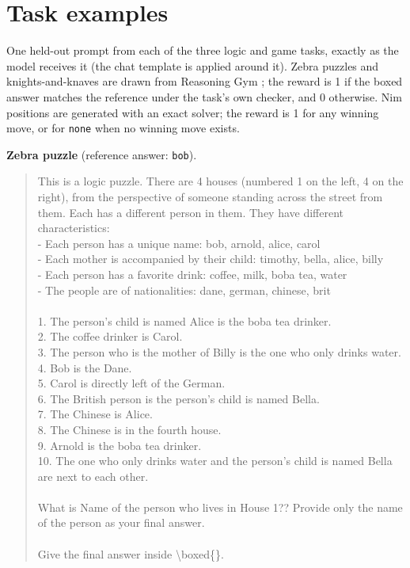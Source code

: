 \documentclass[
  10pt,
]{article}
\begin{document}
\section{Task examples}\label{task-examples}

One held-out prompt from each of the three logic and game tasks, exactly as the model receives it
(the chat template is applied around it). Zebra puzzles and knights-and-knaves are drawn from
Reasoning Gym \cite{r17}; the reward is 1 if the boxed answer matches the reference under the task's
own checker, and 0 otherwise. Nim positions are generated with an exact solver; the reward is 1 for
any winning move, or for \texttt{none} when no winning move exists.

\textbf{Zebra puzzle} (reference answer: \texttt{bob}).

\begin{quote}\small\ttfamily\raggedright\setlength{\parskip}{0pt}
This is a logic puzzle. There are 4 houses (numbered 1 on the left, 4 on the right), from the perspective of someone standing across the street from them. Each has a different person in them. They have different characteristics: \\
 - Each person has a unique name: bob, arnold, alice, carol \\
 - Each mother is accompanied by their child: timothy, bella, alice, billy \\
 - Each person has a favorite drink: coffee, milk, boba tea, water \\
 - The people are of nationalities: dane, german, chinese, brit \\
~ \\
1. The person's child is named Alice is the boba tea drinker. \\
2. The coffee drinker is Carol. \\
3. The person who is the mother of Billy is the one who only drinks water. \\
4. Bob is the Dane. \\
5. Carol is directly left of the German. \\
6. The British person is the person's child is named Bella. \\
7. The Chinese is Alice. \\
8. The Chinese is in the fourth house. \\
9. Arnold is the boba tea drinker. \\
10. The one who only drinks water and the person's child is named Bella are next to each other. \\
~ \\
What is Name of the person who lives in House 1?? Provide only the name of the person as your final answer. \\
~ \\
Give the final answer inside \textbackslash{}boxed\{\}.
\end{quote}
\end{document}
